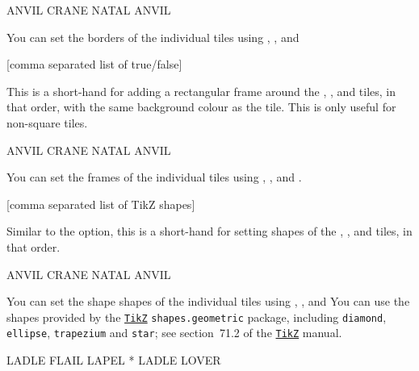 \documentclass[svgnames]{report}
\newcommand\ctan[1]{\href{https://www.ctan.org/pkg/#1}{\texttt{#1}}}
\begin{document}
  \begin{example}
  \begin{wordle}[borders={red, orange,blue}]{ANVIL}
    CRANE
    NATAL
    ANVIL
  \end{wordle}
  \end{example}

  You can set the borders of the individual tiles using
  , ,
   and 

  [comma separated list of true/false]

  This is a short-hand for adding a rectangular frame around the
  , ,  and 
  tiles, in that order, with the same background colour as the
   tile. This is only useful for non-square tiles.

  \begin{example}
  \begin{wordle}[frames={false,true,true}, shapes=circle]{ANVIL}
    CRANE
    NATAL
    ANVIL
  \end{wordle}
  \end{example}

  You can set the frames of the individual tiles using
  , ,
   and .

  [comma separated list of TikZ shapes]

  Similar to the  option, this is a short-hand for
  setting shapes of the , ,
   and  tiles, in that order.

  \begin{example}
  \begin{wordle}[shapes={circle, rectangle, circle}]{ANVIL}
    CRANE
    NATAL
    ANVIL
  \end{wordle}
  \end{example}

  You can set the shape shapes of the individual tiles using
  , ,
   and 
  You can use the shapes provided by the \ctan{TikZ}
  \texttt{shapes.geometric} package, including \texttt{diamond},
  \texttt{ellipse}, \texttt{trapezium} and \texttt{star}; see
  section~71.2 of the \ctan{TikZ} manual.

  \begin{example}
  \begin{wordle}[shapes={diamond, ellipse, star}]{LADLE}
     FLAIL
     LAPEL
     *
     LADLE
     LOVER
  \end{wordle}
  \end{example}
\end{document}
